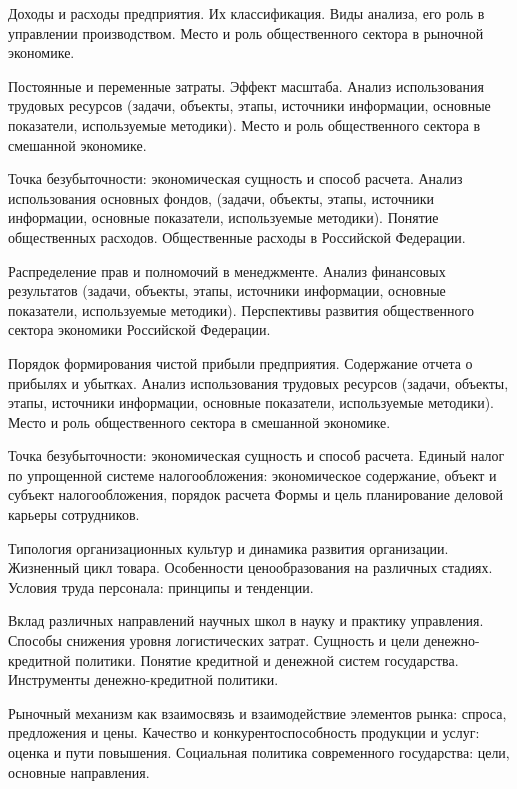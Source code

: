 \documentclass[
	11pt,
	a4paper,
	]
	{article}
\begin{document}
\noindent{} 
	{
		Доходы и расходы предприятия. Их классификация.
	}{
		Виды анализа, его роль в управлении производством.
	}{
		Место и роль общественного сектора в рыночной экономике.
	}

\bigskip

\noindent{} 
	{
		Постоянные и переменные затраты. Эффект масштаба.
	}{
		Анализ использования трудовых ресурсов (задачи, объекты, этапы, источники информации, основные показатели, используемые методики).
	}{
		Место и роль общественного сектора в смешанной экономике.
	}

\bigskip

\noindent{} 
	{
		Точка безубыточности: экономическая сущность и способ расчета.
	}{
		Анализ использования основных фондов, (задачи, объекты, этапы, источники информации, основные показатели, используемые методики).
	}{
		Понятие общественных расходов. Общественные расходы в Российской Федерации.
	}

\bigskip

\noindent{} 
		{
			Распределение прав и полномочий в менеджменте.
		}{
			Анализ финансовых результатов (задачи, объекты, этапы, источники информации, основные показатели, используемые методики).
		}{
			Перспективы развития общественного сектора экономики Российской Федерации.
		}
	\lowGE

\bigskip

\noindent{} 
	{
			Порядок формирования чистой прибыли предприятия. Содержание отчета о прибылях и убытках.
		}{
			Анализ использования трудовых ресурсов (задачи, объекты, этапы, источники информации, основные показатели, используемые методики).
		}{
			Место и роль общественного сектора в смешанной экономике.
		}

\bigskip

\noindent{} 
	{
			Точка безубыточности: экономическая сущность и способ расчета.
		}{
			Единый налог по упрощенной системе налогообложения: экономическое содержание, объект и субъект налогообложения, порядок расчета
		}{
			Формы и цель планирование деловой карьеры сотрудников.
		}

\bigskip

\noindent{} 
	{
			Типология организационных культур и динамика развития организации.
		}{
			Жизненный цикл товара. Особенности ценообразования на различных стадиях.
		}{
			Условия труда персонала: принципы и тенденции.
		}

\bigskip

\noindent{} 
	{
			Вклад различных направлений научных школ в науку и практику управления.
		}{
			Способы снижения уровня логистических затрат.
		}{
			Сущность и цели денежно-кредитной политики. Понятие кредитной и денежной систем государства. Инструменты денежно-кредитной политики.
		}

\bigskip

\noindent{} 
	{
			Рыночный механизм как взаимосвязь и взаимодействие элементов рынка: спроса, предложения и цены.
		}{
			Качество и конкурентоспособность продукции и услуг: оценка и пути повышения.
		}{
			Социальная политика современного государства: цели, основные направления.
		}

\bigskip
\end{document}
